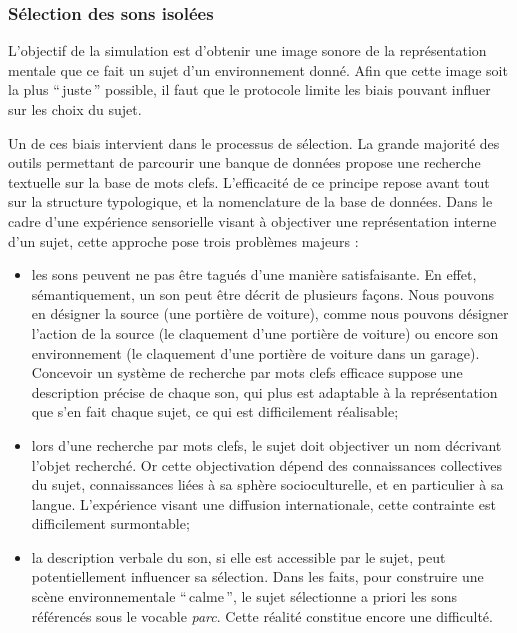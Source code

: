 \subsubsection{Sélection des sons isolées}

L'objectif de la simulation est d'obtenir une image sonore de la représentation mentale que ce fait un sujet d'un environnement donné. Afin que cette image soit la plus ``\,juste\,'' possible, il faut que le protocole limite les biais pouvant influer sur les choix du sujet.

Un de ces biais intervient dans le processus de sélection. La grande majorité des outils permettant de parcourir une banque de données propose une recherche textuelle sur la base de mots clefs. L’efficacité de ce principe repose avant tout sur la structure typologique, et la nomenclature de la base de données. Dans le cadre d'une expérience sensorielle visant à objectiver une représentation interne d'un sujet, cette approche pose trois problèmes majeurs :

\begin{itemize}
\item les sons peuvent ne pas être tagués d'une manière satisfaisante. En effet, sémantiquement, un son peut être décrit de plusieurs façons. Nous pouvons en désigner la source (une portière de voiture), comme nous pouvons désigner l'action de la source (le claquement d’une portière de voiture) ou encore son environnement (le claquement d’une portière de voiture dans un garage). Concevoir un système de recherche par mots clefs efficace suppose une description précise de chaque son, qui plus est adaptable à la représentation que s’en fait chaque sujet, ce qui est difficilement réalisable;

\item lors d'une recherche par mots clefs, le sujet doit objectiver un nom décrivant l'objet recherché. Or cette objectivation dépend des connaissances collectives du sujet, connaissances liées à sa sphère socioculturelle, et en particulier à sa langue. L'expérience visant une diffusion internationale, cette contrainte est difficilement surmontable;

\item la description verbale du son, si elle est accessible par le sujet, peut potentiellement influencer sa sélection. Dans les faits, pour construire une scène environnementale ``\,calme\,'', le sujet sélectionne a priori les sons référencés sous le vocable \emph{parc}. Cette réalité constitue encore une difficulté.
\end{itemize}

